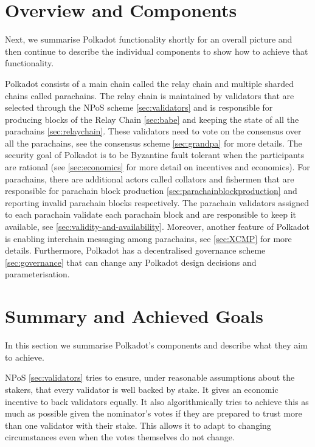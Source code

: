 \section{Overview and Components}\label{sec:components}
Next, we summarise Polkadot functionality shortly for an overall picture and then continue to describe the individual components to show how to achieve that functionality.

Polkadot consists of a main chain called the relay chain and multiple sharded chains called parachains. The relay chain is maintained by validators that are selected through the NPoS scheme \ref{sec:validators} and is responsible for producing blocks of the  Relay Chain \ref{sec:babe} and keeping the state of all the parachains \ref{sec:relaychain}.
These validators need to vote on the consensus over all the parachains, see the consensus scheme \ref{sec:grandpa} for more details.
The security goal of Polkadot is to be Byzantine fault tolerant when the participants are rational (see \ref{sec:economics} for more detail on incentives and economics).
For parachains, there are additional actors called collators and fishermen that are responsible for parachain block production \ref{sec:parachainblockproduction} and reporting invalid parachain blocks respectively.
The parachain validators assigned to each parachain validate each parachain block and are responsible to keep it available, see \ref{sec:validity-and-availability}. Moreover, another feature of Polkadot is enabling interchain messaging among parachains, see \ref{sec:XCMP} for more details.
Furthermore, Polkadot has a decentralised governance scheme \ref{sec:governance} that can change any Polkadot design decisions and parameterisation.










\section{Summary and Achieved Goals}\label{sec:summary}
In this section we summarise Polkadot's components and describe what they aim to achieve. 

NPoS \ref{sec:validators} tries to ensure, under reasonable assumptions about the stakers, that every validator is well backed by stake. It gives an economic incentive to back validators equally. It also algorithmically tries to achieve this as much as possible given the nominator's votes if they are prepared to trust more than one validator with their stake.  This allows it to adapt to changing circumstances even when the votes themselves do not change.


